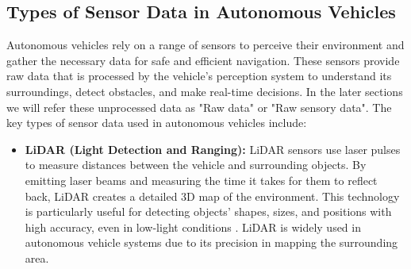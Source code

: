 \subsection{Types of Sensor Data in Autonomous Vehicles} \label{subsection:sensors}
Autonomous vehicles rely on a range of sensors to perceive their environment and
gather the necessary data for safe and efficient navigation. These sensors provide
raw data that is processed by the vehicle's perception system to understand its
surroundings, detect obstacles, and make real-time decisions.
In the later sections we will refer these unprocessed data as "Raw data" or "Raw sensory data".
The key types of sensor data used in autonomous vehicles include:
\begin{itemize}
    \item \textbf{LiDAR (Light Detection and Ranging):}
    LiDAR sensors use laser pulses to measure distances between the vehicle and surrounding objects.
    By emitting laser beams and measuring the time it takes for them to reflect back, LiDAR creates
    a detailed 3D map of the environment. This technology is particularly useful for detecting objects'
    shapes, sizes, and positions with high accuracy, even in low-light conditions \cite{levinson2011towards}.
    LiDAR is widely used in autonomous vehicle systems due to its precision in mapping the surrounding area.


\end{itemize}

